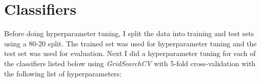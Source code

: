 \documentclass{article}
\newcommand\templateInstruction[1]{
\hl{#1}
}
\begin{document}
\section{Classifiers}

Before doing hyperparameter tuning, I split the data into training and test sets using a 80-20 split. The trained set was used for hyperparameter tuning and the test set was used for evaluation.
Next I did a hyperparameter tuning for each of the classifiers listed below using \textit{GridSearchCV} with 5-fold cross-validation with the following list of hyperparameters:
\end{document}
